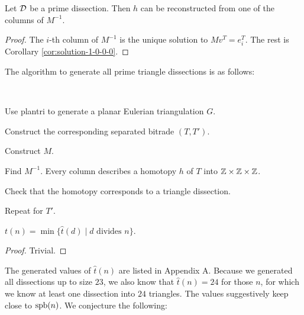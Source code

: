 \begin{lem}
Let $\mathcal D$ be a prime dissection. Then $h$ can be reconstructed from one of the columns of $M^{-1}$.
\end{lem}%
\begin{proof}
The $i$-th column of $M^{-1}$ is the unique solution to $Mv^T = e_i^T$. The rest is Corollary \ref{cor:solution-1-0-0-0}.
\end{proof}

The algorithm to generate all prime triangle dissections is as follows:

\begin{alg}\ 
\begin{cosyenumerate}
	\item Use plantri to generate a planar Eulerian triangulation $G$.
	\item Construct the corresponding separated bitrade $(T,T')$.
	\item Construct $M$.
	\item Find $M^{-1}$. Every column describes a homotopy $h$ of $T$ into $\mathbb Z\times\mathbb Z\times\mathbb Z$.
	\item Check that the homotopy corresponds to a triangle dissection.
	\item Repeat for $T'$.
\end{cosyenumerate}
\end{alg}%

\begin{lem}
$t(n) = \min \{\hat t(d) \mid d \mbox{ divides } n\}$.
\end{lem}
\begin{proof}
Trivial.
\end{proof}



The generated values of $\hat t(n)$ are listed in Appendix A. Because we generated all dissections up to size $23$, we also know that $\hat t(n) = 24$ for those $n$, for which we know at least one dissection into $24$ triangles. The values suggestively keep close to $\mathop{\mathrm{spb}}(n)$. We conjecture the following:




